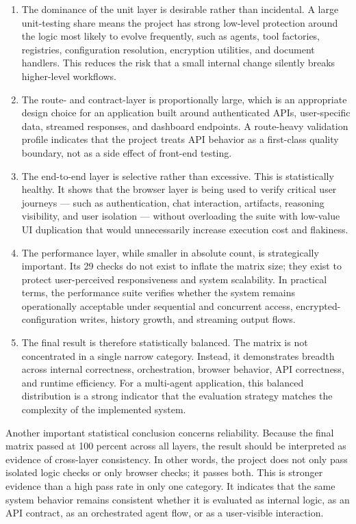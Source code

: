 \documentclass[11pt,a4paper]{report}
\begin{document}
\begin{enumerate}
  \item The dominance of the unit layer is desirable rather than incidental. A large unit-testing share means the project has strong low-level protection around the logic most likely to evolve frequently, such as agents, tool factories, registries, configuration resolution, encryption utilities, and document handlers. This reduces the risk that a small internal change silently breaks higher-level workflows.
  \item The route- and contract-layer is proportionally large, which is an appropriate design choice for an application built around authenticated APIs, user-specific data, streamed responses, and dashboard endpoints. A route-heavy validation profile indicates that the project treats API behavior as a first-class quality boundary, not as a side effect of front-end testing.
  \item The end-to-end layer is selective rather than excessive. This is statistically healthy. It shows that the browser layer is being used to verify critical user journeys --- such as authentication, chat interaction, artifacts, reasoning visibility, and user isolation --- without overloading the suite with low-value UI duplication that would unnecessarily increase execution cost and flakiness.
  \item The performance layer, while smaller in absolute count, is strategically important. Its 29 checks do not exist to inflate the matrix size; they exist to protect user-perceived responsiveness and system scalability. In practical terms, the performance suite verifies whether the system remains operationally acceptable under sequential and concurrent access, encrypted-configuration writes, history growth, and streaming output flows.
  \item The final result is therefore statistically balanced. The matrix is not concentrated in a single narrow category. Instead, it demonstrates breadth across internal correctness, orchestration, browser behavior, API correctness, and runtime efficiency. For a multi-agent application, this balanced distribution is a strong indicator that the evaluation strategy matches the complexity of the implemented system.
\end{enumerate}

Another important statistical conclusion concerns reliability. Because the
final matrix passed at 100 percent across all layers, the result should be
interpreted as evidence of cross-layer consistency. In other words, the
project does not only pass isolated logic checks or only browser checks; it
passes both. This is stronger evidence than a high pass rate in only one
category. It indicates that the same system behavior remains consistent
whether it is evaluated as internal logic, as an API contract, as an
orchestrated agent flow, or as a user-visible interaction.
\end{document}
